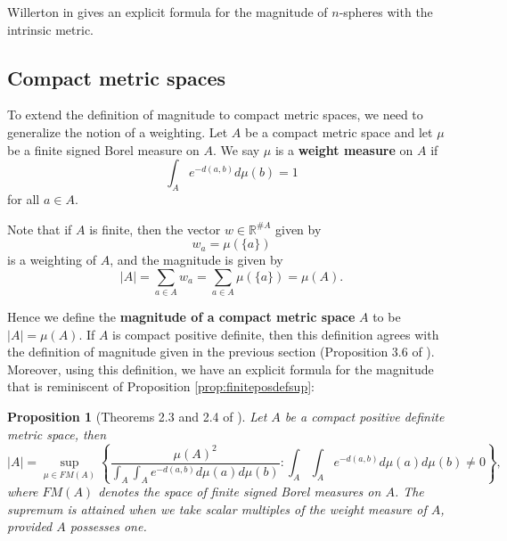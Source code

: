 \documentclass[11pt]{article}
\theoremstyle{mythm}
\newtheorem{prop}[defn]{Proposition}
\begin{document}
Willerton in \cite{willerton_magnitude_2014} gives an explicit formula for the magnitude of $n$-spheres with the intrinsic metric.

\subsection{Compact metric spaces}

To extend the definition of magnitude to compact metric spaces, we need to generalize the notion of a weighting. Let $A$ be a compact metric space and let $\mu$ be a finite signed Borel measure on $A$. We say $\mu$ is a \textbf{weight measure} on $A$ if
\begin{equation*}
\int_A e^{-d(a,b)}d\mu(b) = 1
\end{equation*}
for all $a \in A$.

Note that if $A$ is finite, then the vector $w \in \mathbb{R}^{\# A}$ given by
\begin{equation*}
w_a = \mu(\{a\})
\end{equation*}
is a weighting of $A$, and the magnitude is given by
\begin{equation*}
\vert A \vert = \sum\limits_{a\in A} w_a = \sum\limits_{a \in A} \mu(\{a\}) = \mu(A).
\end{equation*}

Hence we define the \textbf{magnitude of a compact metric space} $A$ to be $\vert A \vert = \mu(A)$. If $A$ is compact positive definite, then this definition agrees with the definition of magnitude given in the previous section (Proposition 3.6 of \cite{leinster_magnitude_2017}). Moreover, using this definition, we have an explicit formula for the magnitude that is reminiscent of Proposition \ref{prop:finiteposdefsup}:

\begin{prop}[Theorems 2.3 and 2.4 of \cite{meckes_positive_2013}]\label{prop:variationalformula}
Let $A$ be a compact positive definite metric space, then
\begin{equation*}
\vert A \vert = \sup\limits_{\mu \in FM(A)}\left\{\frac{\mu(A)^2}{\int_A \int_A e^{-d(a,b)}d\mu(a)d\mu(b)}: \int_A \int_A e^{-d(a,b)}d\mu(a)d\mu(b)\neq0\right\},
\end{equation*}
where $FM(A)$ denotes the space of finite signed Borel measures on $A$. The supremum is attained when we take scalar multiples of the weight measure of $A$, provided $A$ possesses one.
\end{prop}
\end{document}
